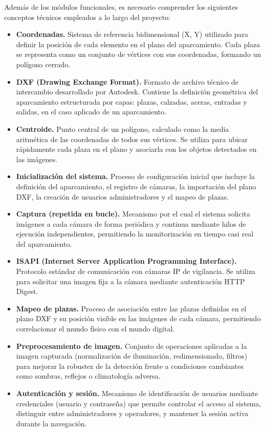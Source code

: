 \documentclass[12pt,a4paper]{article}
\begin{document}
Además de los módulos funcionales, es necesario comprender los siguientes conceptos técnicos empleados a lo largo del proyecto:

\begin{itemize}
	\item \textbf{Coordenadas.} Sistema de referencia bidimensional (X, Y) utilizado para definir la posición de cada elemento en el plano del aparcamiento. Cada plaza se representa como un conjunto de vértices con sus coordenadas, formando un polígono cerrado.
	\item \textbf{DXF (Drawing Exchange Format).} Formato de archivo técnico de intercambio desarrollado por Autodesk. Contiene la definición geométrica del aparcamiento estructurada por capas: plazas, calzadas, aceras, entradas y salidas, en el caso aplicado de un aparcamiento.
	\item \textbf{Centroide.} Punto central de un polígono, calculado como la media aritmética de las coordenadas de todos sus vértices. Se utiliza para ubicar rápidamente cada plaza en el plano y asociarla con los objetos detectados en las imágenes.
	\item \textbf{Inicialización del sistema.} Proceso de configuración inicial que incluye la definición del aparcamiento, el registro de cámaras, la importación del plano DXF, la creación de usuarios administradores y el mapeo de plazas.
	\item \textbf{Captura (repetida en bucle).} Mecanismo por el cual el sistema solicita imágenes a cada cámara de forma periódica y continua mediante hilos de ejecución independientes, permitiendo la monitorización en tiempo casi real del aparcamiento.
	\item \textbf{ISAPI (Internet Server Application Programming Interface).} Protocolo estándar de comunicación con cámaras IP de vigilancia. Se utiliza para solicitar una imagen fija a la cámara mediante autenticación HTTP Digest.
	\item \textbf{Mapeo de plazas.} Proceso de asociación entre las plazas definidas en el plano DXF y su posición visible en las imágenes de cada cámara, permitiendo correlacionar el mundo físico con el mundo digital.
	\item \textbf{Preprocesamiento de imagen.} Conjunto de operaciones aplicadas a la imagen capturada (normalización de iluminación, redimensionado, filtros) para mejorar la robustez de la detección frente a condiciones cambiantes como sombras, reflejos o climatología adversa.
	\item \textbf{Autenticación y sesión.} Mecanismo de identificación de usuarios mediante credenciales (usuario y contraseña) que permite controlar el acceso al sistema, distinguir entre administradores y operadores, y mantener la sesión activa durante la navegación.

\end{itemize}
\end{document}
